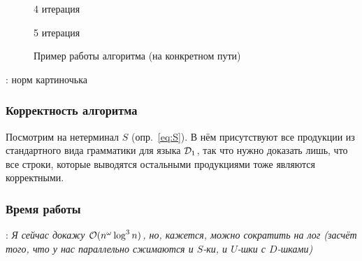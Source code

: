 \begin{figure}[H]
\begin{minipage}[h]{0.47\linewidth}
    \end{minipage}
    \vfill
    \begin{minipage}[h]{0.47\linewidth}
         4 итерация
    \end{minipage}
    \hfill
    \begin{minipage}[h]{0.47\linewidth}
         5 итерация
    \end{minipage}

    \caption{Пример работы алгоритма (на конкретном пути)}
    \label{img:dyck1_example}
\end{figure}

\TODO: норм картиночька

\subsubsection{Корректность алгоритма}

Посмотрим на нетерминал $S$ (опр.~\ref{eq:S}). В нём присутствуют все продукции из стандартного вида грамматики для языка $\mathcal{D}_1$, так что нужно доказать лишь, что все строки, которые выводятся остальными продукциями тоже являются корректными.

\TODO

\subsubsection{Время работы}

\TODO: \textit{Я сейчас докажу $\mathcal{O}(n^{\omega} \log^3 n)$, но, кажется, можно сократить на лог (засчёт того, что у нас параллельно сжимаются и $S$-ки, и $U$-шки с $D$-шками)}

